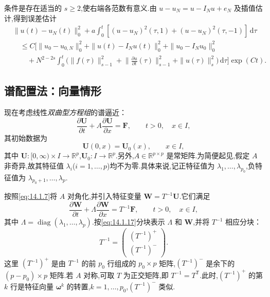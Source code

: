 条件是存在适当的 \(s\ge2\),使右端各范数有意义.由 \(u-u_N=u-I_Nu+e_N\) 及插值估计,得到误差估计
\begin{equation}\label{eq:14.4.17}
  \begin{aligned}
    &\|u(t)-u_N(t)\|_0^2
        +a\int_0^t[(u-u_N)^2(\tau,1)+(u-u_N)^2(\tau,-1)]\,\mathrm d\tau\\
    &\quad\le C\biggl[\|u_0-u_{0,N}\|_0^2
          +\|u(t)-I_Nu(t)\|_0^2+\|u_0-I_Nu_0\|_0^2\\
    &\qquad+N^{2-2s}\int_0^t\biggl(\|f(\tau)\|_{s-1}^2
        +\biggl\|\frac{\partial u}{\partial t}(\tau)\biggr\|_{s-1}^2
        +\|u(\tau)\|_s^2\biggr)\,\mathrm d\tau\biggr]\exp(Ct).
  \end{aligned}
\end{equation}

\subsection{谱配置法：向量情形}\label{sec:14.4.2}

现在考虑线性\emph{双曲型方程组}的谱逼近：
\begin{equation}\label{eq:14.4.18}
  \frac{\partial\boldsymbol{U}}{\partial t}+A\frac{\partial\boldsymbol{U}}{\partial x}
       =\boldsymbol{F},\qquad t>0,\quad x\in I,
\end{equation}
其初始数据为
\begin{equation}\label{eq:14.4.19}
  \boldsymbol{U}(0,x)=\boldsymbol{U}_0(x),\qquad x\in I,
\end{equation}
其中 \(\boldsymbol{U}\colon[0,\infty)\times I\to\mathbb R^p\),\(\boldsymbol{U}_0\colon I\to\mathbb R^p\).另外,\(A\in\mathbb R^{p\times p}\) 是常矩阵.为简便起见,假定 \(A\) 非奇异,故其特征值 \(\lambda_i\)(\(i=1,\ldots,p\))均不为零.具体来说,记正特征值为 \(\lambda_1,\ldots,\lambda_{p_0}\),负特征值为 \(\lambda_{p_0+1},\ldots,\lambda_p\).

按照\eqref{eq:14.1.7}将 \(A\) 对角化,并引入特征变量 \(\boldsymbol{W}=T^{-1}\boldsymbol{U}\).它们满足
\[
  \frac{\partial\boldsymbol{W}}{\partial t}+\Lambda\frac{\partial\boldsymbol{W}}{\partial x}
      =T^{-1}\boldsymbol{F},\qquad t>0,\quad x\in I,
\]
其中 \(\Lambda=\operatorname{diag}(\lambda_1,\ldots,\lambda_p)\).按\eqref{eq:14.1.17}分块表示 \(\Lambda\) 和 \(\boldsymbol{W}\),并将 \(T^{-1}\) 相应分块：
\[
  T^{-1}=\begin{pmatrix}(T^{-1})^+\\(T^{-1})^-\end{pmatrix}.
\]
这里 \((T^{-1})^+\) 是由 \(T^{-1}\) 的前 \(p_0\) 行组成的 \(p_0\times p\) 矩阵,\((T^{-1})^-\) 是余下的 \((p-p_0)\times p\) 矩阵.若 \(A\) 对称,可取 \(T\) 为正交矩阵,即 \(T^{-1}=T^{\mathsf T}\).此时,\((T^{-1})^+\) 的第 \(k\) 行是特征向量 \(\boldsymbol{\omega}^k\) 的转置,\(k=1,\ldots,p_0\),\((T^{-1})^-\) 类似.

